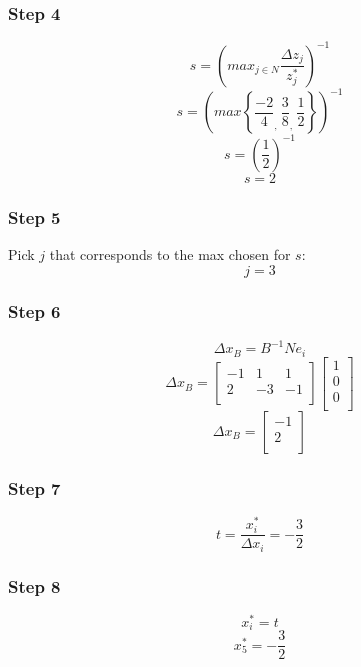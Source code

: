 \documentclass[14pt]{extarticle}
\begin{document}
\subsubsection*{Step 4}
\[
    s = \left(max_{j \in N} \frac{\Delta z_j}{z^*_j}\right)^{-1}
\]
\[
    s = \left(max \left\{ \frac{-2}{4}_{\textstyle,}\ \frac{3}{8}_{\textstyle,}\ \frac{1}{2} \right\} \right)^{-1}
\]
\[
    s = \left(\frac{1}{2}\right)^{-1}
\]
\[
    s = 2
\]

\subsubsection*{Step 5}
Pick $j$ that corresponds to the max chosen for $s$:
\[
    j = 3
\]

\subsubsection*{Step 6}
\[
    \Delta x_B = B^{-1}N e_i
\]
\[
    \Delta x_B =
    \begin{bmatrix}
        -1 & 1 & 1 \\
        2 & -3 & -1 \\
    \end{bmatrix}
    \begin{bmatrix}
        1 \\
        0 \\
        0 \\
    \end{bmatrix}
\]
\[
    \Delta x_B =
    \begin{bmatrix}
        -1 \\
        2 \\
    \end{bmatrix}
\]

\subsubsection*{Step 7}
\[
    t = \frac{x^*_i}{\Delta x_i} = -\frac{3}{2}
\]

\subsubsection*{Step 8}
\[
    x^*_i = t
\]
\[
    x^*_5 = -\frac{3}{2}
\]
\end{document}

